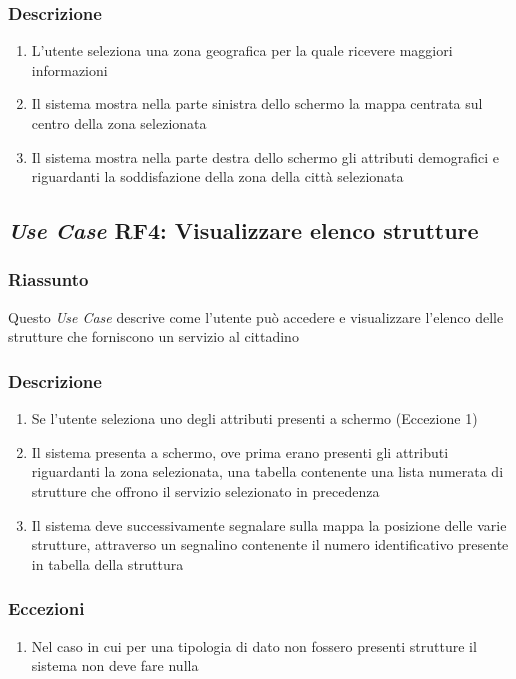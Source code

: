         \subsubsection{Descrizione}
            \begin{enumerate}
                \item L'utente seleziona una zona geografica per la quale ricevere maggiori informazioni
                \item Il sistema mostra nella parte sinistra dello schermo la mappa centrata sul centro della zona selezionata
                \item Il sistema mostra nella parte destra dello schermo gli attributi demografici e riguardanti la soddisfazione della zona della città selezionata
            \end{enumerate}

    \subsection{\textit{Use Case} RF4: Visualizzare elenco strutture}
        \subsubsection{Riassunto}
            Questo \textit{Use Case} descrive come l'utente può accedere e visualizzare l'elenco delle strutture che forniscono un servizio al cittadino
        \subsubsection{Descrizione}
            \begin{enumerate}
                \item Se l'utente seleziona uno degli attributi presenti a schermo (Eccezione 1)
                \item Il sistema presenta a schermo, ove prima erano presenti gli attributi riguardanti la zona selezionata, una tabella contenente una lista numerata di strutture che offrono il servizio selezionato in precedenza
                \item Il sistema deve successivamente segnalare sulla mappa la posizione delle varie strutture, attraverso un segnalino contenente il numero identificativo presente in tabella della struttura
            \end{enumerate}
        \subsubsection{Eccezioni}
            \begin{enumerate}
                \item Nel caso in cui per una tipologia di dato non fossero presenti strutture il sistema non deve fare nulla
            \end{enumerate}
